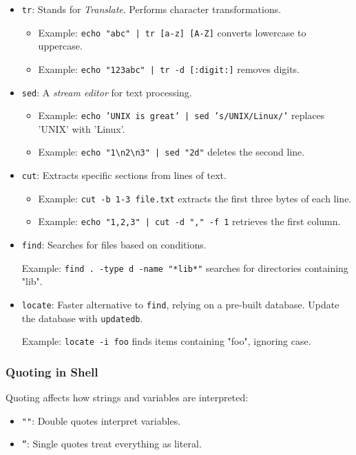 \begin{itemize}
    \item \texttt{tr}: Stands for \textit{Translate}. Performs character transformations.
    \begin{itemize}
        \item Example: \texttt{echo "abc" | tr [a-z] [A-Z]} converts lowercase to uppercase.
        \item Example: \texttt{echo "123abc" | tr -d [:digit:]} removes digits.
    \end{itemize}
    \item \texttt{sed}: A \textit{stream editor} for text processing.
    \begin{itemize}
        \item Example: \texttt{echo 'UNIX is great' | sed 's/UNIX/Linux/'} replaces 'UNIX' with 'Linux'.
        \item Example: \texttt{echo "1\textbackslash{}n2\textbackslash{}n3" | sed "2d"} deletes the second line.
    \end{itemize}
    \item \texttt{cut}: Extracts specific sections from lines of text.
    \begin{itemize}
        \item Example: \texttt{cut -b 1-3 file.txt} extracts the first three bytes of each line.
        \item Example: \texttt{echo "1,2,3" | cut -d "," -f 1} retrieves the first column.
    \end{itemize}
    \item \texttt{find}: Searches for files based on conditions.
    
    Example: \texttt{find . -type d -name "*lib*"} searches for directories containing "lib".

    \item \texttt{locate}: Faster alternative to \texttt{find}, relying on a pre-built database. Update the database with \texttt{updatedb}.
    
    Example: \texttt{locate -i foo} finds items containing "foo", ignoring case.
\end{itemize}

\subsubsection{Quoting in Shell}

Quoting affects how strings and variables are interpreted:
\begin{itemize}
    \item \texttt{""}: Double quotes interpret variables.
    \item \texttt{''}: Single quotes treat everything as literal.
\end{itemize}

